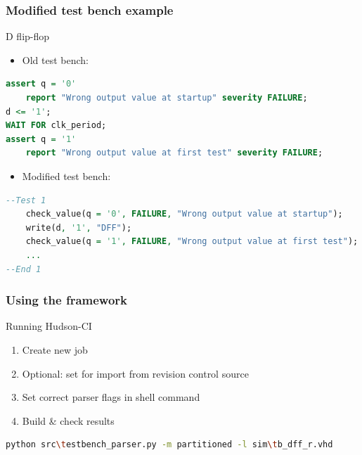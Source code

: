\documentclass[british,10pt]{beamer}
\begin{document}
\begin{frame}[fragile]\frametitle{Modified test bench example}
D flip-flop
\begin{itemize}
\item Old test bench:
\end{itemize}
\begin{lstlisting}[language=VHDL, tabsize=4, frame=single, framesep=2mm, belowskip=5pt, aboveskip=5pt, showstringspaces=false, basicstyle=\scriptsize]
assert q = '0'
    report "Wrong output value at startup" severity FAILURE;
d <= '1';
WAIT FOR clk_period;
assert q = '1'
    report "Wrong output value at first test" severity FAILURE;
\end{lstlisting}
\vskip1pt
\begin{itemize}
\item Modified test bench:
\end{itemize}
\begin{lstlisting}[language=VHDL, tabsize=4, frame=single, framesep=2mm, belowskip=5pt, aboveskip=5pt, showstringspaces=false, basicstyle=\scriptsize]
--Test 1
    check_value(q = '0', FAILURE, "Wrong output value at startup");
    write(d, '1', "DFF");
    check_value(q = '1', FAILURE, "Wrong output value at first test");
    ...
--End 1
\end{lstlisting}
\end{frame}


\begin{frame}[fragile]\frametitle{Using the framework}
Running Hudson-CI
\begin{enumerate}
\item Create new job
\item Optional: set for import from revision control source
\item Set correct parser flags in shell command
\item Build \& check results
\end{enumerate}
\vskip5pt
\begin{lstlisting}[language=bash, tabsize=4, frame=single, framesep=2mm, belowskip=8pt, aboveskip=8pt, showstringspaces=false, basicstyle=\scriptsize]
python src\testbench_parser.py -m partitioned -l sim\tb_dff_r.vhd
\end{lstlisting}
\end{frame}

\end{document}
